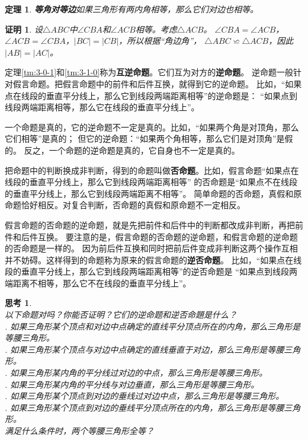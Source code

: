 \documentclass[12pt,UTF8]{ctexbook}
\newtheorem{tm}{定理}[section]
\newtheorem{sk}{思考}[section]
\newtheorem*{proof2}{证明}
\begin{document}
\begin{tm}{\textbf{等角对等边}}\label{tm:4-0-0}
    如果三角形有两内角相等，那么它们对边也相等。
\end{tm}
\begin{proof2}
    设$\triangle ABC$中$\angle CBA$和$\angle ACB$相等。考虑$\triangle ACB$。
    $\angle CBA = \angle ACB$，$\angle ACB = \angle CBA$，$|BC| = |CB|$，所以根据“角边角”，
    $\triangle ABC \backsimeq \triangle ACB$，因此$|AB| = |AC|$。
\end{proof2}

定理\ref{tm:3-0-1}和\ref{tm:3-1-0}称为\textbf{互逆命题}。它们互为对方的\textbf{逆命题}。
逆命题一般针对假言命题。把假言命题中的前件和后件互换，就得到它的逆命题。
比如，“如果点在线段的垂直平分线上，那么它到线段两端距离相等”的逆命题是：
“如果点到线段两端距离相等，那么它在线段的垂直平分线上”。

一个命题是真的，它的逆命题不一定是真的。比如，“如果两个角是对顶角，那么它们相等”是真的；
但它的逆命题：“如果两个角相等，那么它们是对顶角”是假的。
反之，一个命题的逆命题是真的，它自身也不一定是真的。

把命题中的判断换成非判断，得到的命题叫做\textbf{否命题}。比如，假言命题“如果点在线段的垂直平分线上，那么它到线段两端距离相等”
的否命题是“如果点不在线段的垂直平分线上，那么它到线段两端距离不相等”。
简单命题的否命题，真假和原命题恰好相反。对复合判断，否命题的真假和原命题不一定相反。

假言命题的否命题的逆命题，就是先把前件和后件中的判断都改成非判断，再把前件和后件互换。
要注意的是，假言命题的否命题的逆命题，和假言命题的逆命题的否命题是一样的。
因为前后件互换和同时把前后件变成非判断这两个操作互相并不妨碍。这样得到的命题称为原来的假言命题的\textbf{逆否命题}。
比如，“如果点在线段的垂直平分线上，那么它到线段两端距离相等”的逆否命题是
“如果点到线段两端距离不相等，那么它不在线段的垂直平分线上”。

\begin{sk}\label{sk:4-0-0}
    \mbox{}\\
    以下命题对吗？你能否证明？它们的逆命题和逆否命題是什么？\\
    . 如果三角形某个顶点和对边中点确定的直线平分顶点所在的内角，那么三角形是等腰三角形。\\
    . 如果三角形某个顶点与对边中点确定的直线垂直于对边，那么三角形是等腰三角形。\\
    . 如果三角形某内角的平分线过对边的中点，那么三角形是等腰三角形。\\
    . 如果三角形某内角的平分线与对边垂直，那么三角形是等腰三角形。\\
    . 如果三角形某个顶点到对边的垂线过对边中点，那么三角形是等腰三角形。\\
    . 如果三角形某个顶点到对边的垂线平分顶点所在的内角，那么三角形是等腰三角形。\\
    满足什么条件时，两个等腰三角形全等？\\
\end{sk}
\end{document}
